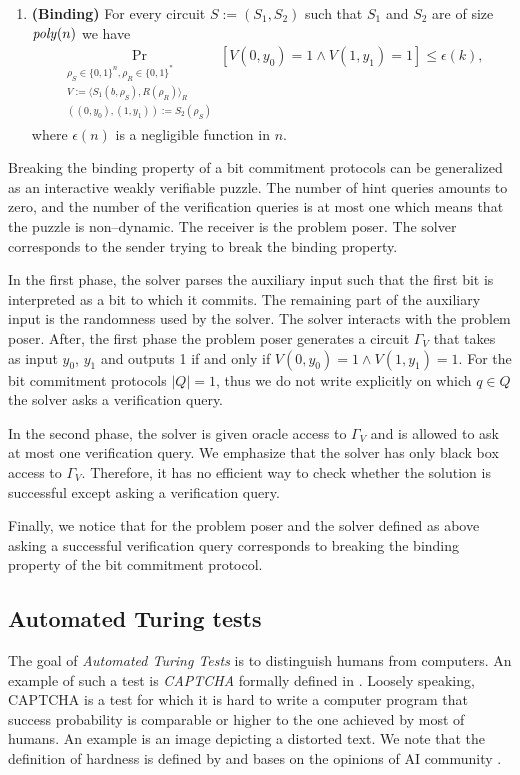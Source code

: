 \begin{definition}
\begin{enumerate}[]
\item{\textnormal{\textbf{(Binding)}}}
  For every circuit $S := (S_1, S_2)$ such that $S_1$ and $S_2$ are of size $\operatorname{\mathit{poly}}(n)$ we have
  \begin{align*}
    \underset{\substack{
        \rho_S \in \{0,1\}^{n}, \rho_R \in \{0,1\}^{*} \\
        V := \langle S_1(b,\rho_S), R(\rho_R) \rangle_{R} \\ ((0, y_0), (1, y_1)) := S_2(\rho_S)}}{\Pr}[V(0,y_0) = 1 \land V(1,y_1) = 1] \leq \epsilon(k),
  \end{align*}
  where $\epsilon(n)$ is a negligible function in $n$.
\end{enumerate}
\end{definition}

Breaking the binding property of a bit commitment protocols can be generalized as an interactive weakly verifiable puzzle.
The number of hint queries amounts to zero, and the number of the verification queries is at most one
which means that the puzzle is non--dynamic.
The receiver is the problem poser. The solver corresponds to the sender trying to break the binding property.

In the first phase, the solver parses the auxiliary input such that the first bit is interpreted as a bit to which
it commits. The remaining part of the auxiliary input is the randomness used by the solver.
The solver interacts with the problem poser.
After, the first phase the problem poser generates a circuit $\Gamma_V$ that takes as input $y_0$, $y_1$ and outputs
1 if and only if $V(0,y_0) = 1 \land V(1,y_1) = 1$.
For the bit commitment protocols $|Q| = 1$, thus we do not write explicitly on which $q \in Q$ the solver asks a verification query.

In the second phase, the solver is given oracle access to $\Gamma_V$ and is allowed to ask at most one verification query.
We emphasize that the solver has only black box access to $\Gamma_V$. Therefore, it has no efficient way to check whether
the solution is successful except asking a verification query.

Finally, we notice that for the problem poser and the solver defined as above asking a successful verification query
corresponds to breaking the binding property of the bit commitment protocol.

\subsection{Automated Turing tests}
The goal of \textit{Automated Turing Tests} is to distinguish humans from computers.
An example of such a test is \textit{CAPTCHA} formally defined in \cite{von2003captcha}.
Loosely speaking, CAPTCHA is a test for which it is hard to write a computer program that success
probability is comparable or higher to the one achieved by most of humans.
An example is an image depicting a distorted text.
We note that the definition of hardness is defined by and bases on the opinions of AI community \cite{von2003captcha}.

